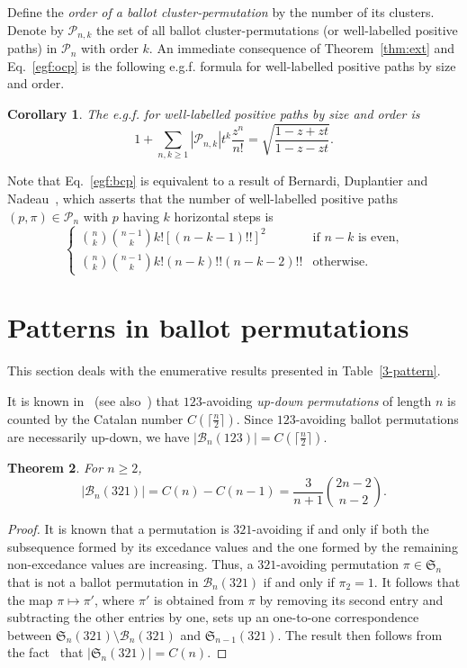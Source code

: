 \documentclass[12pt]{amsart}
\numberwithin{equation}{section}
\theoremstyle{plain}
\newtheorem{theorem}{Theorem}[section]
\newtheorem{corollary}[theorem]{Corollary}
\theoremstyle{definition}
\newcommand{\PP}{\mathcal{P}}
\newcommand{\B}{\mathcal{B}}
\def\S{\mathfrak{S}}
\begin{document}
 Define the {\em order of a ballot cluster-permutation} by the number of its clusters. Denote by $\PP_{n,k}$ the set of all ballot cluster-permutations (or well-labelled positive paths) in $\PP_n$ with order $k$. An immediate consequence of  Theorem~\ref{thm:ext} and Eq.~\eqref{egf:ocp} is the following e.g.f. formula for well-labelled positive paths by size and order.
 \begin{corollary}
 The e.g.f.  for well-labelled positive paths by size and order is 
  \begin{equation}\label{egf:bcp}
 1+\sum_{n,k\geq1}|\PP_{n,k}|t^{k}\frac{z^n}{n!}=\sqrt{\frac{1-z+zt}{1-z-zt}}.
 \end{equation}
 \end{corollary}
 Note that Eq.~\eqref{egf:bcp} is equivalent to a result of Bernardi, Duplantier and Nadeau~\cite[Corollary~13]{BDN}, which asserts that the number of well-labelled positive paths $(p,\pi)\in\PP_n$ with $p$ having $k$ horizontal steps is
 $$
 \begin{cases}
 {n\choose k}{n-1\choose k}k![(n-k-1)!!]^2\qquad &\text{if $n-k$ is even,}\\
 {n\choose k}{n-1\choose k}k!(n-k)!!(n-k-2)!! &\text{otherwise}.
 \end{cases}
 $$
 
\section{Patterns in ballot permutations}%
 \label{sec:4}
 This section deals with the enumerative results presented in Table~\ref{3-pattern}. 
 
 It is known in~\cite[Page~85]{st3} (see also~\cite{Le}) that $123$-avoiding {\em up-down permutations} of length $n$ is counted by the Catalan number $C(\lceil\frac{n}{2}\rceil)$. Since $123$-avoiding ballot permutations are necessarily up-down, we have  $|\B_n(123)|=C(\lceil\frac{n}{2}\rceil)$. 
 
 \begin{theorem}
 For $n\geq2$, 
 $$
 |\B_n(321)|=C(n)-C(n-1)=\frac{3}{n+1}{2n-2\choose n-2}.
 $$
 \end{theorem}
 \begin{proof}
 It is  known that a permutation is $321$-avoiding if and only if both the subsequence formed by its excedance values and the one formed by the remaining non-excedance values are increasing.  Thus, a $321$-avoiding permutation  $\pi\in\S_n$ that is not a ballot permutation in $\B_n(321)$ if and only if $\pi_2=1$. It follows that the map $\pi\mapsto\pi'$, where $\pi'$ is obtained from $\pi$ by removing its second entry and subtracting the other entries by one, sets up an one-to-one correspondence between $\S_n(321)\setminus\B_n(321)$ and $\S_{n-1}(321)$. The result then follows from the fact~\cite{SS} that $|\S_n(321)|=C(n)$. 
 \end{proof}
 
\end{document}

